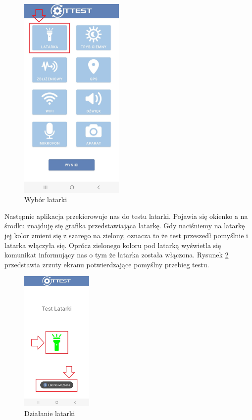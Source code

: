 \begin{figure}[!hbt]
	\begin{center}
		\includegraphics[angle=360, width=0.45\textwidth]{rys/punkt6/latarka1.jpg}
		\caption{Wybór latarki}
		\label{rys:latarka1}
	\end{center}
\end{figure}

Następnie aplikacja przekierowuje nas do testu latarki. Pojawia się okienko a na środku znajduję się grafika przedstawiająca latarkę.
Gdy naciśniemy na latarkę jej kolor zmieni się z szarego na zielony, oznacza to że test przeszedł pomyślnie i latarka włączyła się. Oprócz zielonego koloru pod latarką wyświetla się komunikat informujący nas o tym że latarka została włączona. Rysunek \ref{rys:latarka2} przedstawia zrzuty ekranu potwierdzające pomyślny przebieg testu.
\newpage


\begin{figure}[!hbt]
	\begin{center}
		\includegraphics[angle=360, width=0.31\textwidth]{rys/punkt6/latarka2.jpg}
		\caption{Działanie latarki}
		\label{rys:latarka2}
	\end{center}
\end{figure}


